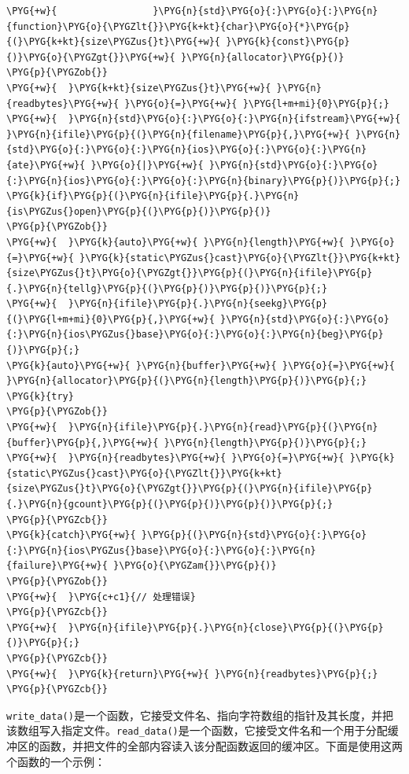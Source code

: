 \begin{codeblockbg}
\begin{Verbatim}[commandchars=\\\{\},breaklines=true,breakanywhere=true,fontsize=\codefont,xleftmargin=17bp]
\PYG{+w}{                 }\PYG{n}{std}\PYG{o}{:}\PYG{o}{:}\PYG{n}{function}\PYG{o}{\PYGZlt{}}\PYG{k+kt}{char}\PYG{o}{*}\PYG{p}{(}\PYG{k+kt}{size\PYGZus{}t}\PYG{+w}{ }\PYG{k}{const}\PYG{p}{)}\PYG{o}{\PYGZgt{}}\PYG{+w}{ }\PYG{n}{allocator}\PYG{p}{)}
\PYG{p}{\PYGZob{}}
\PYG{+w}{  }\PYG{k+kt}{size\PYGZus{}t}\PYG{+w}{ }\PYG{n}{readbytes}\PYG{+w}{ }\PYG{o}{=}\PYG{+w}{ }\PYG{l+m+mi}{0}\PYG{p}{;}
\PYG{+w}{  }\PYG{n}{std}\PYG{o}{:}\PYG{o}{:}\PYG{n}{ifstream}\PYG{+w}{ }\PYG{n}{ifile}\PYG{p}{(}\PYG{n}{filename}\PYG{p}{,}\PYG{+w}{ }\PYG{n}{std}\PYG{o}{:}\PYG{o}{:}\PYG{n}{ios}\PYG{o}{:}\PYG{o}{:}\PYG{n}{ate}\PYG{+w}{ }\PYG{o}{|}\PYG{+w}{ }\PYG{n}{std}\PYG{o}{:}\PYG{o}{:}\PYG{n}{ios}\PYG{o}{:}\PYG{o}{:}\PYG{n}{binary}\PYG{p}{)}\PYG{p}{;}
\PYG{k}{if}\PYG{p}{(}\PYG{n}{ifile}\PYG{p}{.}\PYG{n}{is\PYGZus{}open}\PYG{p}{(}\PYG{p}{)}\PYG{p}{)}
\PYG{p}{\PYGZob{}}
\PYG{+w}{  }\PYG{k}{auto}\PYG{+w}{ }\PYG{n}{length}\PYG{+w}{ }\PYG{o}{=}\PYG{+w}{ }\PYG{k}{static\PYGZus{}cast}\PYG{o}{\PYGZlt{}}\PYG{k+kt}{size\PYGZus{}t}\PYG{o}{\PYGZgt{}}\PYG{p}{(}\PYG{n}{ifile}\PYG{p}{.}\PYG{n}{tellg}\PYG{p}{(}\PYG{p}{)}\PYG{p}{)}\PYG{p}{;}
\PYG{+w}{  }\PYG{n}{ifile}\PYG{p}{.}\PYG{n}{seekg}\PYG{p}{(}\PYG{l+m+mi}{0}\PYG{p}{,}\PYG{+w}{ }\PYG{n}{std}\PYG{o}{:}\PYG{o}{:}\PYG{n}{ios\PYGZus{}base}\PYG{o}{:}\PYG{o}{:}\PYG{n}{beg}\PYG{p}{)}\PYG{p}{;}
\PYG{k}{auto}\PYG{+w}{ }\PYG{n}{buffer}\PYG{+w}{ }\PYG{o}{=}\PYG{+w}{ }\PYG{n}{allocator}\PYG{p}{(}\PYG{n}{length}\PYG{p}{)}\PYG{p}{;}
\PYG{k}{try}
\PYG{p}{\PYGZob{}}
\PYG{+w}{  }\PYG{n}{ifile}\PYG{p}{.}\PYG{n}{read}\PYG{p}{(}\PYG{n}{buffer}\PYG{p}{,}\PYG{+w}{ }\PYG{n}{length}\PYG{p}{)}\PYG{p}{;}
\PYG{+w}{  }\PYG{n}{readbytes}\PYG{+w}{ }\PYG{o}{=}\PYG{+w}{ }\PYG{k}{static\PYGZus{}cast}\PYG{o}{\PYGZlt{}}\PYG{k+kt}{size\PYGZus{}t}\PYG{o}{\PYGZgt{}}\PYG{p}{(}\PYG{n}{ifile}\PYG{p}{.}\PYG{n}{gcount}\PYG{p}{(}\PYG{p}{)}\PYG{p}{)}\PYG{p}{;}
\PYG{p}{\PYGZcb{}}
\PYG{k}{catch}\PYG{+w}{ }\PYG{p}{(}\PYG{n}{std}\PYG{o}{:}\PYG{o}{:}\PYG{n}{ios\PYGZus{}base}\PYG{o}{:}\PYG{o}{:}\PYG{n}{failure}\PYG{+w}{ }\PYG{o}{\PYGZam{}}\PYG{p}{)}
\PYG{p}{\PYGZob{}}
\PYG{+w}{  }\PYG{c+c1}{// 处理错误}
\PYG{p}{\PYGZcb{}}
\PYG{+w}{  }\PYG{n}{ifile}\PYG{p}{.}\PYG{n}{close}\PYG{p}{(}\PYG{p}{)}\PYG{p}{;}
\PYG{p}{\PYGZcb{}}
\PYG{+w}{  }\PYG{k}{return}\PYG{+w}{ }\PYG{n}{readbytes}\PYG{p}{;}
\PYG{p}{\PYGZcb{}}
\end{Verbatim}
\end{codeblockbg}



\texttt{write\_\allowbreak{}data()}是一个函数，它接受文件名、指向字符数组的指针及其长度，并把该数组写入指定文件。\texttt{read\_\allowbreak{}data()}是一个函数，它接受文件名和一个用于分配缓冲区的函数，并把文件的全部内容读入该分配函数返回的缓冲区。下面是使用这两个函数的一个示例：


